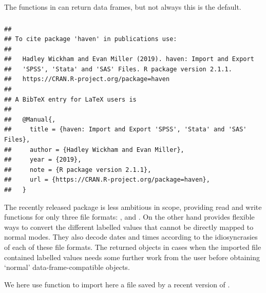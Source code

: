 \documentclass[krantz2]{krantz}\usepackage{knitr}%
\begin{document}
The functions in  can return data frames, but not always this is the default.

\subsubsection[haven]{}

\begin{knitrout}\footnotesize
{}\color{fgcolor}\begin{kframe}
\begin{alltt}
\hlstd{(} \hlstd{=} \hlstd{)}
\end{alltt}
\begin{verbatim}
## 
## To cite package 'haven' in publications use:
## 
##   Hadley Wickham and Evan Miller (2019). haven: Import and Export
##   'SPSS', 'Stata' and 'SAS' Files. R package version 2.1.1.
##   https://CRAN.R-project.org/package=haven
## 
## A BibTeX entry for LaTeX users is
## 
##   @Manual{,
##     title = {haven: Import and Export 'SPSS', 'Stata' and 'SAS' Files},
##     author = {Hadley Wickham and Evan Miller},
##     year = {2019},
##     note = {R package version 2.1.1},
##     url = {https://CRAN.R-project.org/package=haven},
##   }
\end{verbatim}
\end{kframe}
\end{knitrout}

The recently released package  is less ambitious in scope, providing read and write functions for only three file formats: ,  and . On the other hand  provides flexible ways to convert the different labelled values that cannot be directly mapped to normal \Rlang modes. They also decode dates and times according to the idiosyncrasies of each of these file formats. The returned  objects in cases when the imported file contained labelled values needs some further work from the user before obtaining `normal' data-frame-compatible  objects.

We here use function  to import here a  file saved by a recent version of .
\end{document}
